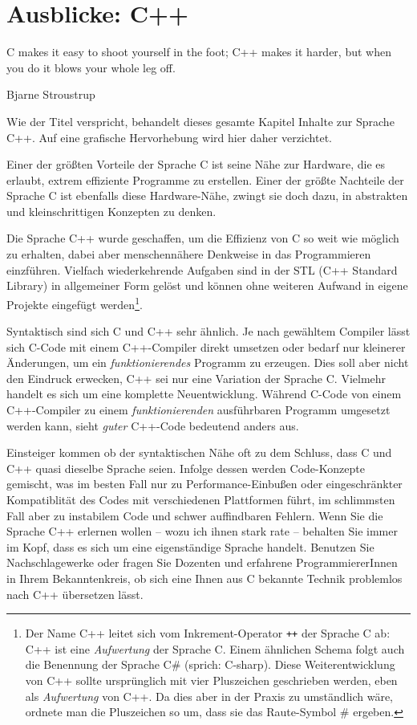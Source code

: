 \chapter{Ausblicke: C++}
\epigraph{C makes it easy to shoot yourself in the foot; C++ makes it harder, but when you do it blows your whole leg off.}{Bjarne Stroustrup}

\begin{plusbox}
Wie der Titel verspricht, behandelt dieses gesamte Kapitel Inhalte zur Sprache C++. Auf eine grafische Hervorhebung wird hier daher verzichtet.
\end{plusbox}

Einer der größten Vorteile der Sprache C ist seine Nähe zur Hardware, die es erlaubt, extrem effiziente Programme zu erstellen. Einer der größte Nachteile der Sprache C ist ebenfalls diese Hardware-Nähe, zwingt sie doch dazu, in abstrakten und kleinschrittigen Konzepten zu denken.

Die Sprache C++ wurde geschaffen, um die Effizienz von C so weit wie möglich zu erhalten, dabei aber menschennähere Denkweise in das Programmieren einzführen. Vielfach wiederkehrende Aufgaben sind in der STL (C++ Standard Library) in allgemeiner Form gelöst und können ohne weiteren Aufwand in eigene Projekte eingefügt werden\footnote{Der Name C++ leitet sich vom Inkrement-Operator \texttt{++} der Sprache C ab: C++ ist eine \emph{Aufwertung} der Sprache C. Einem ähnlichen Schema folgt auch die Benennung der Sprache C\# (sprich: C-sharp). Diese Weiterentwicklung von C++ sollte ursprünglich mit vier Pluszeichen geschrieben werden, eben als \emph{Aufwertung} von C++. Da dies aber in der Praxis zu umständlich wäre, ordnete man die Pluszeichen so um, dass sie das Raute-Symbol \# ergeben.}.

Syntaktisch sind sich C und C++ sehr ähnlich. Je nach gewähltem Compiler lässt sich C-Code mit einem C++-Compiler direkt umsetzen oder bedarf nur kleinerer Änderungen, um ein \emph{funktionierendes} Programm zu erzeugen. Dies soll aber nicht den Eindruck erwecken, C++ sei nur eine Variation der Sprache C. Vielmehr handelt es sich um eine komplette Neuentwicklung. Während C-Code von einem C++-Compiler zu einem \emph{funktionierenden} ausführbaren Programm umgesetzt werden kann, sieht \emph{guter} C++-Code bedeutend anders aus.

\begin{warnbox}
Einsteiger kommen ob der syntaktischen Nähe oft zu dem Schluss, dass C und C++ quasi dieselbe Sprache seien. Infolge dessen werden Code-Konzepte gemischt, was im besten Fall nur zu Performance-Einbußen oder eingeschränkter Kompatiblität des Codes mit verschiedenen Plattformen führt, im schlimmsten Fall aber zu instabilem Code und schwer auffindbaren Fehlern. Wenn Sie die Sprache C++ erlernen wollen -- wozu ich ihnen stark rate -- behalten Sie immer im Kopf, dass es sich um eine eigenständige Sprache handelt. Benutzen Sie Nachschlagewerke oder fragen Sie Dozenten und erfahrene ProgrammiererInnen in Ihrem Bekanntenkreis, ob sich eine Ihnen aus C bekannte Technik problemlos nach C++ übersetzen lässt.
\end{warnbox}

